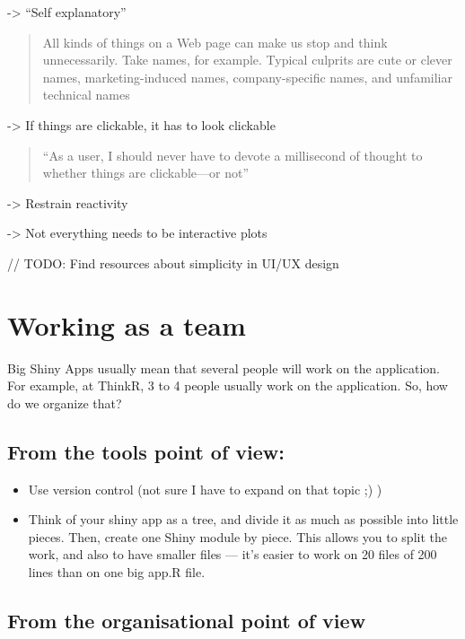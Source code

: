 \documentclass[]{book}
\providecommand{\tightlist}{%
  \setlength{\itemsep}{0pt}\setlength{\parskip}{0pt}}
\begin{document}
-\textgreater{} ``Self explanatory''

\begin{quote}
All kinds of things on a Web page can make us stop and think unnecessarily. Take names, for example. Typical culprits are cute or clever names, marketing-induced names, company-specific names, and unfamiliar technical names
\end{quote}

-\textgreater{} If things are clickable, it has to look clickable

\begin{quote}
``As a user, I should never have to devote a millisecond of thought to whether
things are clickable---or not''
\end{quote}

-\textgreater{} Restrain reactivity

-\textgreater{} Not everything needs to be interactive plots

// TODO: Find resources about simplicity in UI/UX design

\hypertarget{working-as-a-team}{%
\section{Working as a team}\label{working-as-a-team}}

Big Shiny Apps usually mean that several people will work on the application. For example, at ThinkR, 3 to 4 people usually work on the application. So, how do we organize that?

\hypertarget{from-the-tools-point-of-view}{%
\subsection{From the tools point of view:}\label{from-the-tools-point-of-view}}

\begin{itemize}
\tightlist
\item
  Use version control (not sure I have to expand on that topic ;) )
\item
  Think of your shiny app as a tree, and divide it as much as possible into little pieces. Then, create one Shiny module by piece. This allows you to split the work, and also to have smaller files --- it's easier to work on 20 files of 200 lines than on one big app.R file.
\end{itemize}

\hypertarget{from-the-organisational-point-of-view}{%
\subsection{From the organisational point of view}\label{from-the-organisational-point-of-view}}
\end{document}
